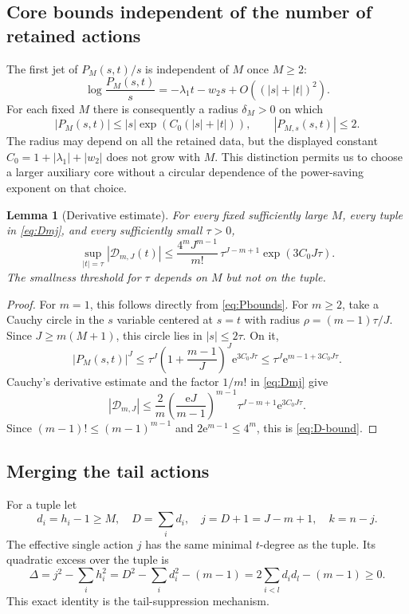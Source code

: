 \documentclass[11pt,a4paper]{article}
\numberwithin{equation}{section}
\newtheorem{lemma}[theorem]{Lemma}
\theoremstyle{definition}
\theoremstyle{remark}\newtheorem{remark}[theorem]{Remark}
\newcommand{\ee}{\mathrm e}\newcommand{\dd}{\mathrm d}
\begin{document}
\subsection{Core bounds independent of the number of retained actions}
The first jet of $P_M(s,t)/s$ is independent of $M$ once $M\ge2$:
\begin{equation}
 \log\frac{P_M(s,t)}s=-\lambda_1t-w_2s+O((|s|+|t|)^2).
 \label{eq:Pjet}
\end{equation}
For each fixed $M$ there is consequently a radius $\delta_M>0$ on which
\begin{equation}
 |P_M(s,t)|\le |s|\exp(C_0(|s|+|t|)),\qquad |P_{M,s}(s,t)|\le2.
 \label{eq:Pbounds}
\end{equation}
The radius may depend on all the retained data, but the displayed constant
$C_0=1+|\lambda_1|+|w_2|$ does not grow with $M$. This distinction permits
us to choose a larger auxiliary core without a circular dependence of the
power-saving exponent on that choice.

\begin{lemma}[Derivative estimate]
\label{lem:D-bound}
For every fixed sufficiently large $M$, every tuple in
\eqref{eq:Dmj}, and every sufficiently small $\tau>0$,
\begin{equation}
 \sup_{|t|=\tau}|\mathcal D_{m,J}(t)|
 \le \frac{4^mJ^{m-1}}{m!}\,
 \tau^{J-m+1}\exp(3C_0J\tau).
 \label{eq:D-bound}
\end{equation}
The smallness threshold for $\tau$ depends on $M$ but not on the tuple.
\end{lemma}
\begin{proof}
For $m=1$, this follows directly from \eqref{eq:Pbounds}.
For $m\ge2$, take a Cauchy circle in the $s$ variable centered at $s=t$
with radius $\rho=(m-1)\tau/J$. Since $J\ge m(M+1)$, this circle lies in
$|s|\le2\tau$. On it,
\[
 |P_M(s,t)|^J\le
 \tau^J\left(1+\frac{m-1}J\right)^J\ee^{3C_0J\tau}
 \le \tau^J\ee^{m-1+3C_0J\tau}.
\]
Cauchy's derivative estimate and the factor $1/m!$ in
\eqref{eq:Dmj} give
\[
 |\mathcal D_{m,J}|
 \le\frac2m\left(\frac{\ee J}{m-1}\right)^{m-1}
 \tau^{J-m+1}\ee^{3C_0J\tau}.
\]
Since $(m-1)!\le(m-1)^{m-1}$ and $2\ee^{m-1}\le4^m$, this is
\eqref{eq:D-bound}.
\end{proof}

\subsection{Merging the tail actions}
For a tuple let
\begin{equation}
 d_i=h_i-1\ge M,\quad D=\sum_i d_i,\quad j=D+1=J-m+1,\quad k=n-j.
 \label{eq:merge-notation}
\end{equation}
The effective single action $j$ has the same minimal $t$-degree as the tuple.
Its quadratic excess over the tuple is
\begin{equation}
 \Delta=j^2-\sum_i h_i^2
 =D^2-\sum_i d_i^2-(m-1)
 =2\sum_{i<l}d_id_l-(m-1)\ge0.
 \label{eq:defect}
\end{equation}
This exact identity is the tail-suppression mechanism.
\end{document}
